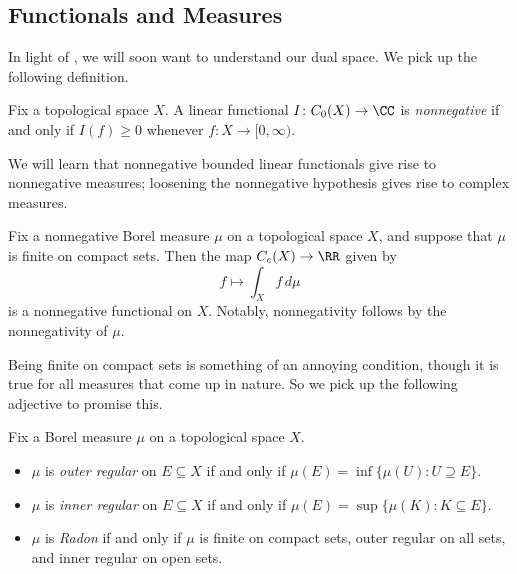 \documentclass[../notes.tex]{subfiles}
\begin{document}
\subsection{Functionals and Measures}
In light of , we will soon want to understand our dual space. We pick up the following definition.
\begin{definition}[nonnegative]
	Fix a topological space $X$. A linear functional $I\colon C_0(X)\to\CC$ is \textit{nonnegative} if and only if $I(f)\ge0$ whenever $f\colon X\to[0,\infty)$.
\end{definition}
We will learn that nonnegative bounded linear functionals give rise to nonnegative measures; loosening the nonnegative hypothesis gives rise to complex measures.
\begin{example}
	Fix a nonnegative Borel measure $\mu$ on a topological space $X$, and suppose that $\mu$ is finite on compact sets. Then the map $C_c(X)\to\RR$ given by
	\[f\mapsto\int_Xf\,d\mu\]
	is a nonnegative functional on $X$. Notably, nonnegativity follows by the nonnegativity of $\mu$.
\end{example}
Being finite on compact sets is something of an annoying condition, though it is true for all measures that come up in nature. So we pick up the following adjective to promise this.
\begin{defihelper}   
	Fix a Borel measure $\mu$ on a topological space $X$.
	\begin{itemize}
		\item $\mu$ is \textit{outer regular} on $E\subseteq X$ if and only if $\mu(E)=\inf\{\mu(U):U\supseteq E\}$.
		\item $\mu$ is \textit{inner regular} on $E\subseteq X$ if and only if $\mu(E)=\sup\{\mu(K):K\subseteq E\}$.
		\item $\mu$ is \textit{Radon} if and only if $\mu$ is finite on compact sets, outer regular on all sets, and inner regular on open sets.
	\end{itemize}
\end{defihelper}
\end{document}

